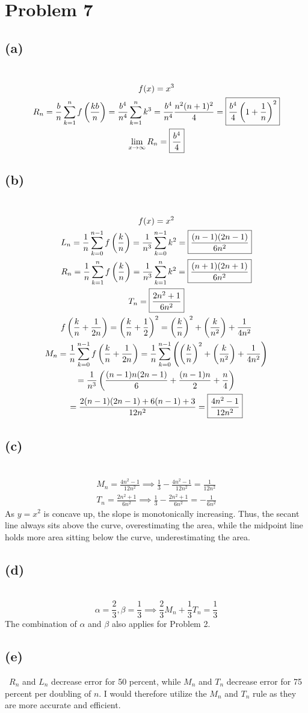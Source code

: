 \documentclass[12pt]{article}
\newcommand*{\paren}[1]{\ensuremath\left(#1\right)}
\newcommand{\vem}{\vspace{0.5em}}
\newcommand{\problem}[1]{\section{Problem #1}}
\newcommand{\subproblem}[1]{\subsection{(#1)} \,}
\begin{document}
\problem{7}

\subproblem{a}
\begin{gather*}
    f(x)=x^3\\
    R_n=\frac{b}{n} \sum_{k=1}^n f\paren{\frac{kb}{n}}=\frac{b^4}{n^4}\sum_{k=1}^n k^3=\frac{b^4}{n^4}\frac{n^2(n+1)^2}{4}=\boxed{\frac{b^4}{4}\paren{1+\frac{1}{n}}^2}\\
    \lim_{x \to \infty} R_n =\boxed{\frac{b^4}{4}}
\end{gather*}

\subproblem{b}
\begin{gather*}
    f(x)=x^2\\
    L_n=\frac{1}{n} \sum_{k=0}^{n-1}f\paren{\frac{k}{n}}=\frac{1}{n^3} \sum_{k=0}^{n-1} k^2=\boxed{\frac{(n-1)(2n-1)}{6n^2}}\\
    R_n=\frac{1}{n} \sum_{k=1}^{n}f\paren{\frac{k}{n}}=\frac{1}{n^3} \sum_{k=1}^{n} k^2=\boxed{\frac{(n+1)(2n+1)}{6n^2}}\\
    T_n=\boxed{\frac{2n^2+1}{6n^2}}\\
    f\paren{\frac{k}{n}+\frac{1}{2n}}=\paren{\frac{k}{n}+\frac{1}{2}}^2=\paren{\frac{k}{n}}^2+\paren{\frac{k}{n^2}}+\frac{1}{4n^2}\\
    M_n=\frac{1}{n}\sum_{k=0}^{n-1}f\paren{\frac{k}{n}+\frac{1}{2n}}=\frac{1}{n} \sum_{k=0}^{n-1} \paren{\paren{\frac{k}{n}}^2+\paren{\frac{k}{n^2}}+\frac{1}{4n^2}}\\
    =\frac{1}{n^3}\paren{\frac{(n-1)n(2n-1)}{6}+\frac{(n-1)n}{2}+\frac{n}{4}}\\
    =\frac{2(n-1)(2n-1)+6(n-1)+3}{12n^2}=\boxed{\frac{4n^2-1}{12n^2}}\\
\end{gather*}

\subproblem{c}
\begin{gather*}
    M_n=\frac{4n^2-1}{12n^2} \implies \frac{1}{3}-\frac{4n^2-1}{12n^2} = \frac{1}{12n^2}\\
    T_n=\frac{2n^2+1}{6n^2} \implies \frac{1}{3}-\frac{2n^2+1}{6n^2}=-\frac{1}{6n^2}
\end{gather*}
As $y=x^2$ is concave up, the slope is monotonically increasing. Thus, the secant line always sits above the curve, overestimating the area, while the midpoint line holds more area sitting below the curve, underestimating the area. \vem

\subproblem{d}
\[
\alpha =\frac{2}{3}, \beta =\frac{1}{3}\implies \frac{2}{3}M_n+\frac{1}{3}T_n=\frac{1}{3}
\]
The combination of $\alpha$ and $\beta$ also applies for Problem 2.\vem

\subproblem{e}
$R_n$ and $L_n$ decrease error for 50 percent, while $M_n$ and $T_n$ decrease error for 75 percent per doubling of $n$. I would therefore utilize the $M_n$ and $T_n$ rule as they are more accurate and efficient.
\end{document}
